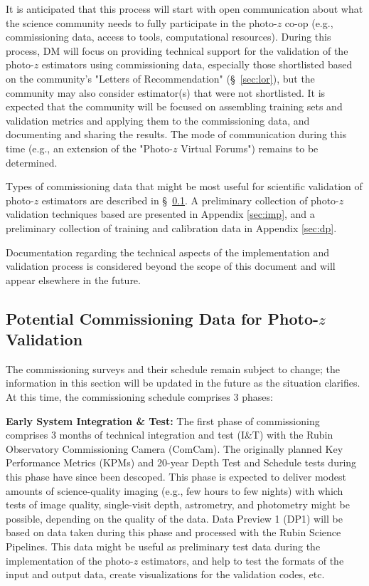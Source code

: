 \documentclass[DM,authoryear,toc]{lsstdoc}
\begin{document}
It is anticipated that this process will start with open communication about what the science community needs to fully participate in the photo-$z$ co-op (e.g., commissioning data, access to tools, computational resources).
During this process, DM will focus on providing technical support for the validation of the photo-$z$ estimators using commissioning data, especially those shortlisted based on the community's "Letters of Recommendation" (\S~\ref{sec:lor}), but the community may also consider estimator(s) that were not shortlisted.
It is expected that the community will be focused on assembling training sets and validation metrics and applying them to the commissioning data, and documenting and sharing the results.
The mode of communication during this time (e.g., an extension of the "Photo-$z$ Virtual Forums") remains to be determined.

Types of commissioning data that might be most useful for scientific validation of photo-$z$ estimators are described in \S~\ref{ssec:pzcoop_commissioning}.
A preliminary collection of photo-$z$ validation techniques based are presented in Appendix \ref{sec:imp}, and a preliminary collection of training and calibration data in Appendix \ref{sec:dp}.

Documentation regarding the technical aspects of the implementation and validation process is considered beyond the scope of this document and will appear elsewhere in the future.

\subsection{Potential Commissioning Data for Photo-$z$ Validation}\label{ssec:pzcoop_commissioning}

The commissioning surveys and their schedule remain subject to change; the information in this section will be updated in the future as the situation clarifies.
At this time, the commissioning schedule comprises 3 phases: 

{\bf Early System Integration \& Test:}
The first phase of commissioning comprises 3 months of technical integration and test (I\&T) with the Rubin Observatory Commissioning Camera (ComCam).
The originally planned Key Performance Metrics (KPMs) and 20-year Depth Test and Schedule tests during this phase have since been descoped. 
This phase is expected to deliver modest amounts of science-quality imaging (e.g., few hours to few nights) with which tests of image quality, single-visit depth, astrometry, and photometry might be possible, depending on the quality of the data.  
Data Preview 1 (DP1) will be based on data taken during this phase and processed with the Rubin Science Pipelines. 
This data might be useful as preliminary test data during the implementation of the photo-$z$ estimators, and help to test the formats of the input and output data, create visualizations for the validation codes, etc.
\end{document}
